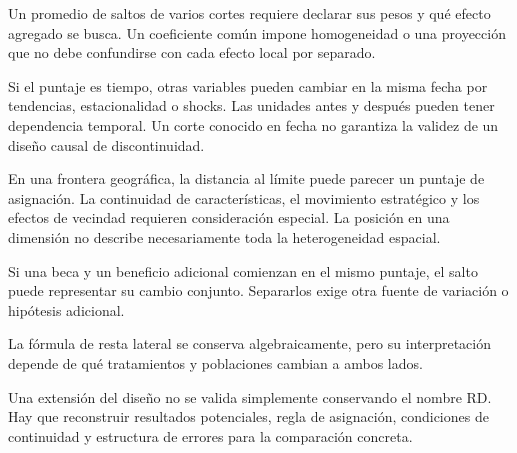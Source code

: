 \documentclass[11pt,a4paper]{article}
\begin{document}
Un promedio de saltos de varios cortes
requiere declarar sus pesos y qué
efecto agregado se busca.
Un coeficiente común impone
homogeneidad o una proyección
que no debe confundirse con
cada efecto local por separado.

Si el puntaje es tiempo,
otras variables pueden cambiar
en la misma fecha por tendencias,
estacionalidad o shocks.
Las unidades antes y después
pueden tener dependencia temporal.
Un corte conocido en fecha
no garantiza la validez de
un diseño causal de discontinuidad.

En una frontera geográfica, la
distancia al límite puede parecer
un puntaje de asignación.
La continuidad de características,
el movimiento estratégico y los
efectos de vecindad requieren
consideración especial.
La posición en una dimensión
no describe necesariamente toda
la heterogeneidad espacial.

\begin{ejemplo}
Si una beca y un beneficio adicional
comienzan en el mismo puntaje,
el salto puede representar
su cambio conjunto.
Separarlos exige otra fuente
de variación o hipótesis adicional.
\end{ejemplo}
La fórmula de resta lateral
se conserva algebraicamente,
pero su interpretación depende
de qué tratamientos y poblaciones
cambian a ambos lados.

Una extensión del diseño no
se valida simplemente conservando
el nombre RD.
Hay que reconstruir resultados
potenciales, regla de asignación,
condiciones de continuidad
y estructura de errores
para la comparación concreta.

\clearpage
\end{document}
